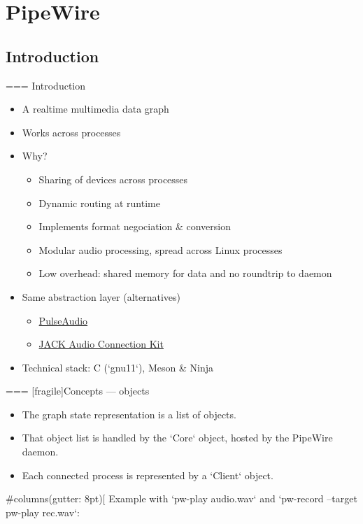 \section{PipeWire}

\subsection{Introduction}

=== {Introduction}
  \begin{itemize}
  \item A realtime multimedia data graph
  \item Works across processes
  \item Why?
    \begin{itemize}
    \item Sharing of devices across processes
    \item Dynamic routing at runtime
    \item Implements format negociation \& conversion
    \item Modular audio processing, spread across Linux processes
    \item Low overhead: shared memory for data and no roundtrip to daemon
    \end{itemize}
  \item Same abstraction layer (alternatives)
    \begin{itemize}
    \item \href{https://www.freedesktop.org/wiki/Software/PulseAudio/}{PulseAudio}
    \item \href{https://jackaudio.org/}{JACK Audio Connection Kit}
    \end{itemize}
  \item Technical stack: C (`gnu11`), Meson \& Ninja
  \end{itemize}




=== [fragile]{Concepts — objects}

  \begin{itemize}
  \item The graph state representation is a list of objects.
  \item That object list is handled by the `Core` object, hosted
    by the PipeWire daemon.
  \item Each connected process is represented by a `Client` object.
  \end{itemize}

  
#columns(gutter: 8pt)[
      Example with `pw-play audio.wav` and
      `pw-record --target pw-play rec.wav`:

